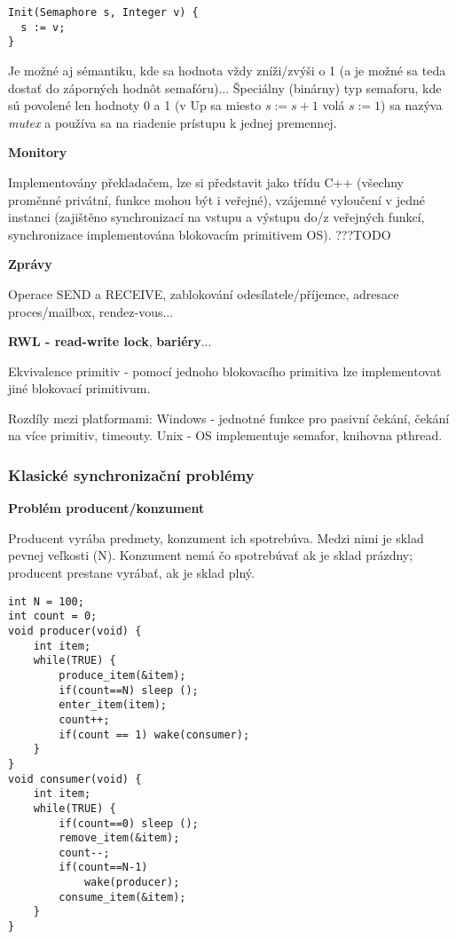 \begin{verbatim}
Init(Semaphore s, Integer v) {
  s := v;
}
\end{verbatim}

Je možné  aj sémantiku, kde sa hodnota vždy zníži/zvýši o 1 (a je možné sa teda dostať do záporných hodnôt semafóru)... Špeciálny (binárny) typ semaforu, kde sú povolené len hodnoty 0 a 1 (v Up sa miesto $s:=s+1$ volá $s:=1$) sa nazýva \emph{mutex} a používa sa na riadenie prístupu k jednej premennej.

\textbf{Monitory}
\par Implementovány překladačem, lze si představit jako třídu C++ (všechny proměnné privátní, funkce mohou být i veřejné), vzájemné vyloučení v jedné instanci (zajištěno synchronizací na vstupu a výstupu do/z veřejných funkcí, synchronizace implementována blokovacím primitivem OS). ???TODO

\textbf{Zprávy}
\par Operace SEND a RECEIVE, zablokování odesílatele/příjemce, adresace proces/mailbox, rendez-vous...

\textbf{RWL - read-write lock}, \textbf{bariéry}...

Ekvivalence primitiv - pomocí jednoho blokovacího primitiva lze implementovat jiné blokovací primitivum.

Rozdíly mezi platformami: Windows - jednotné funkce pro pasivní čekání, čekání na více primitiv, timeouty. Unix - OS implementuje semafor, knihovna pthread.

\subsubsection*{Klasické synchronizační problémy}
\textbf{Problém producent/konzument}
\par Producent vyrába predmety, konzument ich spotrebúva. Medzi nimi je sklad pevnej veľkosti (N). Konzument nemá čo spotrebúvať ak je sklad prázdny; producent prestane vyrábať, ak je sklad plný. 

\begin{verbatim}
int N = 100;
int count = 0;
void producer(void) {
    int item;
    while(TRUE) {
        produce_item(&item);
        if(count==N) sleep ();
        enter_item(item);
        count++;
        if(count == 1) wake(consumer);
    }
}
void consumer(void) {
    int item;
    while(TRUE) {
        if(count==0) sleep ();
        remove_item(&item);
        count--;
        if(count==N-1)
            wake(producer);
        consume_item(&item);
    }
}
\end{verbatim}

